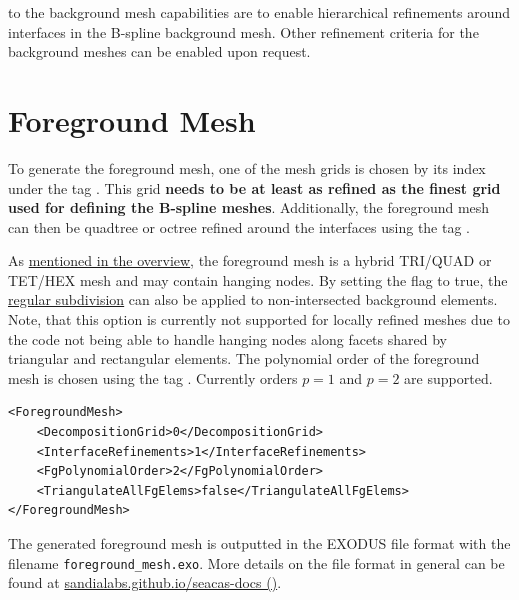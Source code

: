  to the background mesh capabilities are to enable hierarchical refinements around interfaces in the B-spline background mesh. Other refinement criteria for the background meshes can be enabled upon request.

\section{Foreground Mesh}
\label{sec:tutorial_foreground}

To generate the foreground mesh, one of the mesh grids is chosen by its index under the tag . This grid \textbf{needs to be at least as refined as the finest grid used for defining the B-spline meshes}. Additionally, the foreground mesh can then be quadtree or octree refined around the interfaces using the tag .

As \hyperlink{foreground_mesh_properties}{mentioned in the overview}, the foreground mesh is a hybrid TRI/QUAD or TET/HEX mesh and may contain hanging nodes. By setting the flag  to true, the \hyperlink{regular_subdivision}{regular subdivision} can also be applied to non-intersected background elements. Note, that this option is currently not supported for locally refined meshes due to the code not being able to handle hanging nodes along facets shared by triangular and rectangular elements. The polynomial order of the foreground mesh is chosen using the tag . Currently orders $p=1$ and $p=2$ are supported.

\begin{minipage}{\linewidth}
\vspace{0.5cm}
\begin{lstlisting}[caption={Definition of a multiple mesh grids},captionpos=b, label={lst:fg_mesh}]
<ForegroundMesh>
    <DecompositionGrid>0</DecompositionGrid>
    <InterfaceRefinements>1</InterfaceRefinements>
    <FgPolynomialOrder>2</FgPolynomialOrder>
    <TriangulateAllFgElems>false</TriangulateAllFgElems>
</ForegroundMesh>
\end{lstlisting}
\end{minipage}

The generated foreground mesh is outputted in the EXODUS file format with the filename \texttt{foreground\_mesh.exo}. More details on the file format in general can be found at \href{https://sandialabs.github.io/seacas-docs/html/index.html}{sandialabs.github.io/seacas-docs (\ExternalLink)}.


